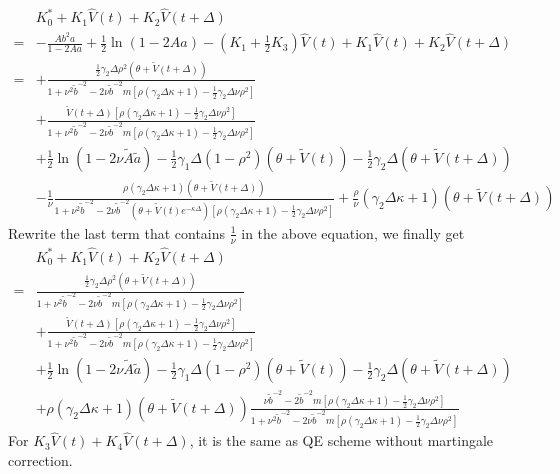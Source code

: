 \documentclass{ws-ijfe}
\begin{document}
\begin{equation*}
  \begin{split}
    &K_0^*+K_1\hat{V}(t)+K_2\hat{V}(t+\Delta)\\
    =&-\frac{Ab^2a}{1-2Aa}+\frac{1}{2}\ln(1-2Aa)-(K_1+\frac{1}{2}K_3)\hat{V}(t)+K_1\hat{V}(t)+K_2\hat{V}(t+\Delta)\\
    =&+\frac{\frac{1}{2}\gamma_2\Delta\rho^2(\theta+\tilde{V}(t+\Delta))}{1+\nu^2\tilde{b}^{-2}-2\nu\tilde{b}^{-2}m[\rho(\gamma_2\Delta\kappa+1)-\frac{1}{2}\gamma_2\Delta\nu\rho^2]}\\
  &+\frac{\mathring{V}(t+\Delta)[\rho(\gamma_2\Delta\kappa+1)-\frac{1}{2}\gamma_2\Delta\nu\rho^2]}{1+\nu^2\tilde{b}^{-2}-2\nu\tilde{b}^{-2}m[\rho(\gamma_2\Delta\kappa+1)-\frac{1}{2}\gamma_2\Delta\nu\rho^2]}\\
  &+\frac{1}{2}\ln(1-2\nu\tilde{A}\tilde{a})-\frac{1}{2}\gamma_1\Delta(1-\rho^2)(\theta+\tilde{V}(t))-\frac{1}{2}\gamma_2\Delta(\theta+\tilde{V}(t+\Delta))\\
  &-\frac{1}{\nu}\frac{\rho(\gamma_2\Delta\kappa+1)(\theta+\tilde{V}(t+\Delta))}{1+\nu^2\tilde{b}^{-2}-2\nu\tilde{b}^{-2}(\theta+\tilde{V}(t)e^{-\kappa\Delta})[\rho(\gamma_2\Delta\kappa+1)-\frac{1}{2}\gamma_2\Delta\nu\rho^2]}+\frac{\rho}{\nu}(\gamma_2\Delta\kappa+1)(\theta+\tilde{V}(t+\Delta))
  \end{split}
\end{equation*}
Rewrite the last term that contains $\frac{1}{\nu}$ in the above equation, we finally get
\begin{align*}
  &K_0^*+K_1\hat{V}(t)+K_2\hat{V}(t+\Delta)\\
  =&\frac{\frac{1}{2}\gamma_2\Delta\rho^2(\theta+\tilde{V}(t+\Delta))}{1+\nu^2\tilde{b}^{-2}-2\nu\tilde{b}^{-2}m[\rho(\gamma_2\Delta\kappa+1)-\frac{1}{2}\gamma_2\Delta\nu\rho^2]}\\
  &+\frac{\mathring{V}(t+\Delta)[\rho(\gamma_2\Delta\kappa+1)-\frac{1}{2}\gamma_2\Delta\nu\rho^2]}{1+\nu^2\tilde{b}^{-2}-2\nu\tilde{b}^{-2}m[\rho(\gamma_2\Delta\kappa+1)-\frac{1}{2}\gamma_2\Delta\nu\rho^2]}\\
  &+\frac{1}{2}\ln(1-2\nu\tilde{A}\tilde{a})-\frac{1}{2}\gamma_1\Delta(1-\rho^2)(\theta+\tilde{V}(t))-\frac{1}{2}\gamma_2\Delta(\theta+\tilde{V}(t+\Delta))\\
  &+\rho(\gamma_2\Delta\kappa+1)(\theta+\tilde{V}(t+\Delta))\frac{\nu\tilde{b}^{-2}-2\tilde{b}^{-2}m[\rho(\gamma_2\Delta\kappa+1)-\frac{1}{2}\gamma_2\Delta\nu\rho^2]}{1+\nu^2\tilde{b}^{-2}-2\nu\tilde{b}^{-2}m[\rho(\gamma_2\Delta\kappa+1)-\frac{1}{2}\gamma_2\Delta\nu\rho^2]}
\end{align*}
For $K_3\hat{V}(t)+K_4\hat{V}(t+\Delta)$, it is the same as QE scheme without martingale correction.\\
\end{document}
